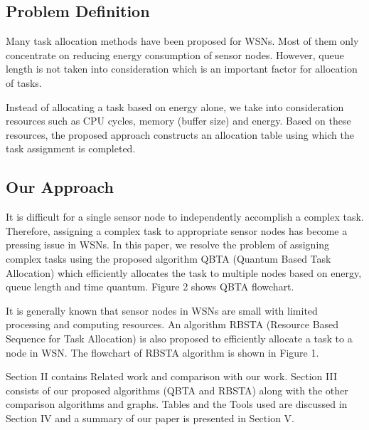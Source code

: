 \documentclass[conference]{IEEEtran}
\begin{document}
\subsection{Problem Definition}
\par Many task allocation methods have been proposed for WSNs. Most of them only concentrate on reducing energy consumption of sensor nodes.  However, queue length is not taken into consideration which is an important factor for allocation of tasks.
\par Instead of allocating a task based on energy alone, we take into consideration resources such as CPU cycles, memory (buffer size) and energy. Based on these resources, the proposed approach constructs an allocation table using which the task assignment is completed.
\subsection{Our Approach}
\par It is difficult for a single sensor node to independently accomplish a complex task. Therefore, assigning a complex task to appropriate sensor nodes has become a pressing issue in WSNs. In this paper, we resolve the problem of assigning complex tasks using the proposed algorithm QBTA (Quantum Based Task Allocation) which efficiently allocates the task to multiple nodes based on energy, queue length and time quantum. Figure 2 shows QBTA flowchart.


\par It is generally known that sensor nodes in WSNs are small with limited processing and computing resources. An algorithm RBSTA (Resource Based Sequence for Task Allocation) is also proposed to efficiently allocate a task to a node in WSN. The flowchart of RBSTA algorithm is shown in Figure 1. 

\par  Section II contains Related work and comparison with our work. Section III consists of our proposed algorithms (QBTA and RBSTA) along with the other comparison algorithms and graphs. Tables and the Tools used are discussed in Section IV and a summary of our paper is presented in Section V.
\end{document}
